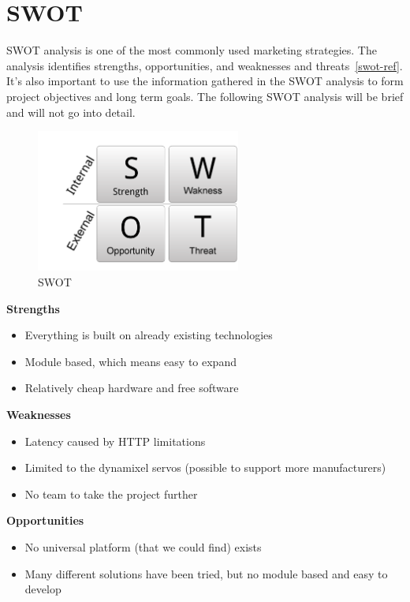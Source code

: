 \chapter{SWOT}
SWOT analysis is one of the most commonly used marketing strategies. 
The analysis identifies strengths, opportunities, and weaknesses and threats~\ref{swot-ref}.
It's also important to use the information gathered in the SWOT analysis to form project objectives and long term goals. 
The following SWOT analysis will be brief and will not go into detail. 
\vspace{\secspace}

\begin{figure}[H]
    \centering
    \includegraphics[width=0.6\textwidth]{graphics/swot.png}	
    \caption{SWOT}
    \label{fig:sw}
\end{figure}

\textbf{\Large Strengths}
\begin{itemize}
	 \item Everything is built on already existing technologies
	 \item Module based, which means easy to expand
	 \item Relatively cheap hardware and free software
\end{itemize}

\textbf{\Large Weaknesses}
\begin{itemize}
	 \item Latency caused by HTTP limitations
	 \item Limited to the dynamixel servos (possible to support more manufacturers)
	 \item No team to take the project further
\end{itemize}

\textbf{\Large Opportunities}
\begin{itemize}
	 \item No universal platform (that we could find) exists
	 \item Many different solutions have been tried, but no module based and easy to develop
\end{itemize}

